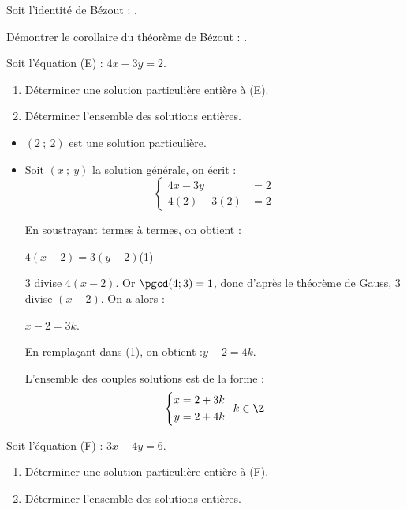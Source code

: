 \begin{colonne*exercice}
\begin{exercice}
  Soit l'identité de Bézout : .

  Démontrer le corollaire du théorème de Bézout : .
\end{exercice}

\columnbreak

\begin{exercice*}
\label{exo-eq_diophantienne}
Soit l'équation (E) : $4x-3y = 2$.
\begin{enumerate}
\item Déterminer une solution particulière entière à (E).
\item Déterminer l'ensemble des solutions entières.
\end{enumerate}
\end{exercice*}
\begin{corrige}
  \begin{itemize}
  \item $(2\ ;\ 2)$ est une solution particulière.
  \item Soit $(x\ ;\ y)$ la solution générale, on écrit :
    $$\left\{\begin{aligned}
        4x-3y&=2\\
        4(2)-3(2)&=2\end{aligned}\right.$$
    
En soustrayant termes à termes, on obtient : 

$4(x-2)=3(y-2)$\enskip (1)

3 divise $4(x-2)$. Or $\pgcd(4;3)=1$, donc d'après le théorème de
Gauss, 3 divise $(x-2)$. On a alors :

$x-2=3k$.

En remplaçant dans (1), on obtient :\enskip $y-2=4k$.

L'ensemble des couples solutions est de la forme :
$$\left\{\begin{aligned}
x&=2+3k\\
y&=2+4k\end{aligned}\right.\enskip k\in\Z$$
\end{itemize}
\end{corrige}

\begin{exercice}
Soit l'équation (F) : $3x - 4y = 6$.
\begin{enumerate}
\item Déterminer une solution particulière entière à (F).
\item Déterminer l'ensemble des solutions entières.
\end{enumerate}
\end{exercice}


\end{colonne*exercice}
